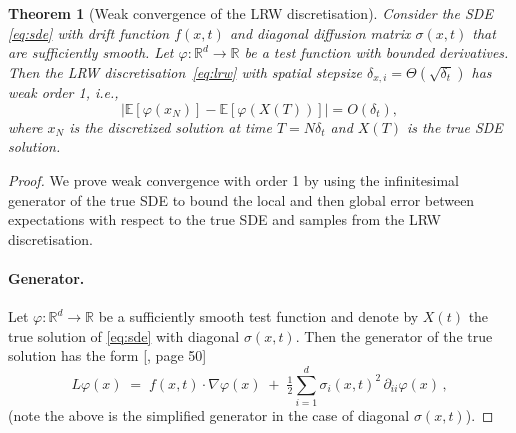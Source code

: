 \documentclass[pra,showpacs,amsmath,amssymb,amsfonts,lengthcheck,longbibliography,onecolumn]{revtex4-2}
\newcommand{\E}{\mathbb{E}}
\newtheorem{theorem_reset}{Theorem}
\begin{document}
\begin{theorem_reset}[Weak convergence of the LRW discretisation]
Consider the SDE \eqref{eq:sde} with drift function $f(x,t)$ and diagonal diffusion
matrix $\sigma(x,t)$ that are sufficiently smooth.
Let $\varphi: \mathbb{R}^d \to \mathbb{R}$ be a test function with bounded derivatives. 
Then the LRW discretisation~\eqref{eq:lrw} with spatial stepsize
$\delta_{x, i} = \Theta(\sqrt{\delta_t})$ has weak order 1, i.e.,
\[
\bigl|\E[\varphi(x_N)] - \E[\varphi(X(T))]\bigr| = O(\delta_t),
\]
where $x_N$ is the discretized solution at time $T = N\delta_t$ and $X(T)$ is the true SDE solution.
\end{theorem_reset}
\begin{proof}We prove weak convergence with order 1 by using the infinitesimal generator of the true SDE to bound the local and then global error between expectations with respect to the true SDE and samples from the LRW discretisation.



\paragraph{Generator.}
Let $\varphi\colon\mathbb{R}^d\to\mathbb{R}$ be a sufficiently smooth test function and denote by $X(t)$ the true solution of \eqref{eq:sde} with diagonal $\sigma(x, t)$. Then the generator of the true solution has the form [\citealp{pavliotis2014stochastic}, page 50]
\[
  L\varphi(x) \;=\; f(x,t)\cdot\nabla\varphi(x)\;+\;\tfrac12\sum_{i=1}^d\sigma_i(x,t)^2\,\partial_{ii}\varphi(x)\,,
\]
(note the above is the simplified generator in the case of diagonal $\sigma(x, t)$).



\end{proof}
\end{document}
